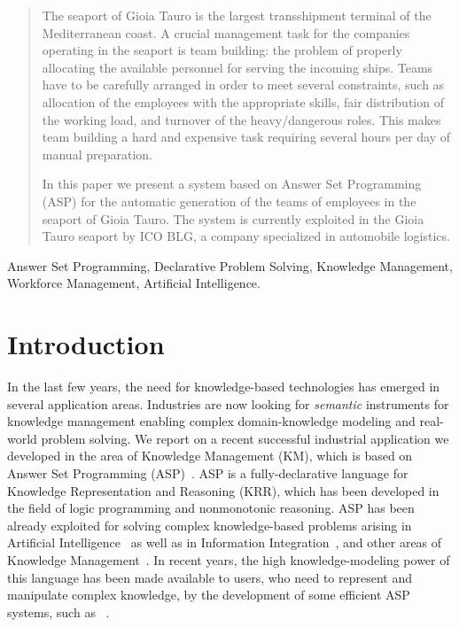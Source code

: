 \documentclass{tlp}
\begin{document}
\begin{abstract}
The seaport of Gioia Tauro is the largest transshipment terminal of the Mediterranean coast.
A crucial management task for the companies operating in the seaport is
team building: the problem of properly allocating the available personnel for serving the incoming ships.
Teams have to be carefully arranged in order to meet several constraints, such as
allocation of the employees with the appropriate skills, fair distribution of the working
load, and turnover of the heavy/dangerous roles.
This makes team building a hard and expensive task requiring several hours per day of manual preparation.

In this paper we present a system based on Answer Set Programming (ASP)
for the automatic generation of  the teams of employees in the seaport of Gioia Tauro.
The system is currently exploited in the Gioia Tauro seaport by ICO BLG,
a company specialized in automobile logistics.
\end{abstract}

\begin{keywords}
Answer Set Programming, Declarative Problem Solving, Knowledge Management,
Workforce Management, Artificial Intelligence.
\end{keywords}






\section{Introduction}\label{sec:intro}
In the last few years, the need for knowledge-based technologies has emerged in
several application areas.  Industries are now looking for \textit{semantic}
instruments for knowledge management 
enabling complex domain-knowledge modeling and real-world problem solving.
We report on a recent successful industrial application we developed in the area of Knowledge Management (KM), which is based on Answer Set Programming (ASP)~\cite{gelf-lifs-91}.
ASP is a fully-declarative language for Knowledge Representation and Reasoning (KRR),
which has been developed in the field of logic programming and nonmonotonic reasoning.
ASP has been already exploited for solving complex knowledge-based problems
arising in Artificial Intelligence~\cite{bara-gelf-2000,bald-etal-01,bara-uyan-2001,frie-08-techrep,fran-etal-2001,gebs-etal-2007-lpnmr-competition,noge-etal-2001}
as well as in Information Integration~\cite{leon-etal-2005},
and other areas of Knowledge Management~\cite{bara-2002,bard-95,grass-etal-09-apps-lpnmr}.
In recent years, the high knowledge-modeling power of this language
has been made available to users, who need to represent and manipulate complex knowledge,
by the development of some efficient ASP systems, such as \dlv~\cite{leon-etal-2002-dlv}.
\end{document}
